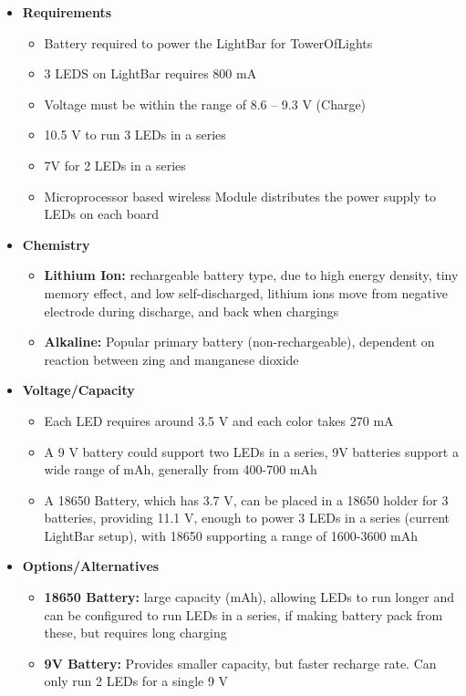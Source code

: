 \documentclass[12pt]{article}
\begin{document}
		{\renewcommand\labelitemi{}
			\begin{itemize}
				\item \textbf{Requirements}
					\begin{itemize}
						\item Battery required to power the LightBar for TowerOfLights
						\item 3 LEDS on LightBar requires 800 mA
						\item Voltage must be within the range of 8.6 – 9.3 V (Charge)
						\item 10.5 V to run 3 LEDs in a series
						\item 7V for 2 LEDs in a series
						\item Microprocessor based wireless Module distributes the power supply to LEDs on each board
					\end{itemize}
				\item \textbf{Chemistry}
					\begin{itemize}
						\item \textbf{Lithium Ion:} rechargeable battery type, due to high energy density, tiny memory effect, and low self-discharged, lithium ions move from negative electrode during discharge, and back when chargings
						\item \textbf{Alkaline:} Popular primary battery (non-rechargeable), dependent on reaction between zing and manganese dioxide
					\end{itemize}
				\item \textbf{Voltage/Capacity}
					\begin{itemize}
						\item Each LED requires around 3.5 V and each color takes 270 mA
						\item A 9 V battery could support two LEDs in a series, 9V batteries support a wide range of mAh, generally from 400-700 mAh
						\item A 18650 Battery, which has 3.7 V, can be placed in a 18650 holder for 3 batteries, providing 11.1 V, enough to power 3 LEDs in a series (current LightBar setup), with 18650 supporting a range of 1600-3600 mAh
					\end{itemize}
				\item \textbf{Options/Alternatives}
					\begin{itemize}
						\item \textbf{18650 Battery:} large capacity (mAh), allowing LEDs to run longer and can be configured to run LEDs in a series, if making battery pack from these, but requires long charging
						\item \textbf{9V Battery:} Provides smaller capacity, but faster recharge rate. Can only run 2 LEDs for a single 9 V
					\end{itemize}
			\end{itemize}
	
}
\end{document}
